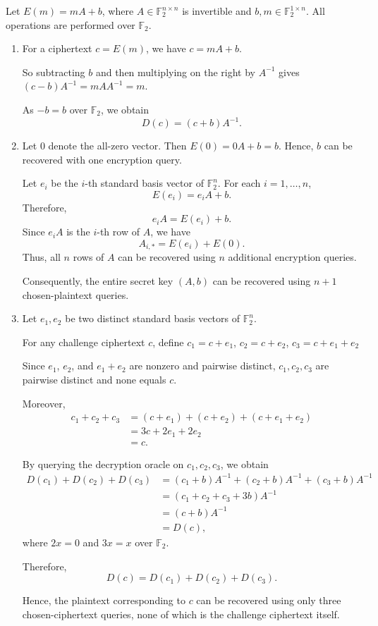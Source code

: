 \begin{loigiai}

Let $E(m)=mA+b$, where $A\in\mathbb{F}_2^{n\times n}$
is invertible and $b,m\in\mathbb{F}_2^{1\times n}$.
All operations are performed over $\mathbb{F}_2$.

\begin{enumerate}[label=(\alph*)]
\item

For a ciphertext $c=E(m)$, we have \(c=mA+b\).


So subtracting $b$ and then multiplying on the right by $A^{-1}$ gives
\(
(c-b)A^{-1}=mAA^{-1}=m.
\)


As $-b=b$ over $\mathbb{F}_2$, we obtain
\[
\boxed{D(c)=(c+b)A^{-1}.}
\]

\item

Let $0$ denote the all-zero vector. Then \(E(0)=0A+b=b\).
Hence, $b$ can be recovered with one encryption query.

Let $e_i$ be the $i$-th standard basis vector
of $\mathbb{F}_2^n$. For each $i=1,\ldots,n$,
\[
E(e_i)=e_iA+b.
\]
Therefore,
\[
e_iA=E(e_i)+b.
\]
Since $e_iA$ is the $i$-th row of $A$, we have
\[
\boxed{A_{i,*}=E(e_i)+E(0).}
\]
Thus, all $n$ rows of $A$ can be recovered using
$n$ additional encryption queries.

Consequently, the entire secret key $(A,b)$
can be recovered using \({n+1}\)
chosen-plaintext queries.

\item

Let $e_1,e_2$ be two distinct
standard basis vectors of $\mathbb{F}_2^n$.

For any challenge ciphertext $c$, define
\(c_1=c+e_1\), \(c_2=c+e_2\), \(c_3=c+e_1+e_2\)

Since $e_1$, $e_2$, and $e_1+e_2$ are nonzero
and pairwise distinct, $c_1,c_2,c_3$ are
pairwise distinct and none equals $c$.

Moreover,
\[
\begin{aligned}
c_1+c_2+c_3
&=(c+e_1)+(c+e_2)+(c+e_1+e_2)\\
&=3c+2e_1+2e_2\\
&=c.
\end{aligned}
\]

By querying the decryption oracle on
$c_1,c_2,c_3$, we obtain
\[
\begin{aligned}
D(c_1)+D(c_2)+D(c_3)
&=(c_1+b)A^{-1}
 +(c_2+b)A^{-1}
 +(c_3+b)A^{-1}\\
&=(c_1+c_2+c_3+3b)A^{-1}\\
&=(c+b)A^{-1}\\
&=D(c),
\end{aligned}
\]
where $2x=0$ and $3x=x$ over $\mathbb{F}_2$.

Therefore,
\[
\boxed{D(c)=D(c_1)+D(c_2)+D(c_3).}
\]

Hence, the plaintext corresponding to $c$
can be recovered using only three
chosen-ciphertext queries, none of which
is the challenge ciphertext itself.

\end{enumerate}

\end{loigiai}
